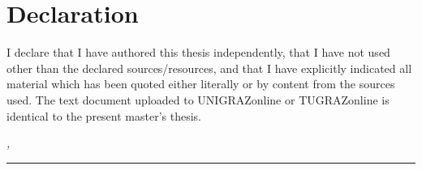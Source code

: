 %
\chapter*{Declaration}
\label{sec:declaration}
\thispagestyle{empty}



I declare that I have authored this thesis independently, that I have not used other than the declared sources/resources, and that I have explicitly indicated all material which has been quoted either literally or by content from the sources used. The text document uploaded to UNIGRAZonline or TUGRAZonline is identical to the present master's thesis.

\bigskip

\noindent\textit{\thesisUniversityCity, \thesisDate}

\smallskip

\begin{flushright}
	\begin{minipage}{5cm}
		\rule{\textwidth}{1pt}
		\centering\thesisName
	\end{minipage}
\end{flushright}

